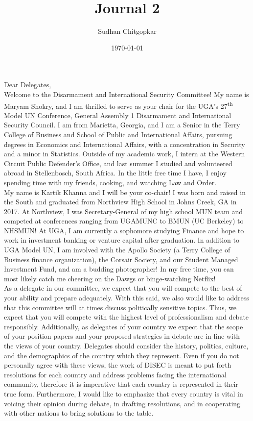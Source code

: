 \documentclass[10pt, letterpaper]{article}
\title{Journal 2}
\author{Sudhan Chitgopkar}
\date{\today}
\begin{document}
Dear Delegates,\\

Welcome to the Disarmament and International Security
Committee! My name is Maryam Shokry, and I am thrilled to serve as your
chair for the UGA's 27\textsuperscript{th} Model UN Conference, General
Assembly 1 Disarmament and International Security Council. I am from
Marietta, Georgia, and I am a Senior in the Terry College of Business
and School of Public and International Affairs, pursuing degrees in
Economics and International Affairs, with a concentration in Security
and a minor in Statistics. Outside of my academic work, I intern at the
Western Circuit Public Defender's Office, and last summer I studied and
volunteered abroad in Stellenbosch, South Africa. In the little free
time I have, I enjoy spending time with my friends, cooking, and
watching Law and Order. \\

My name is Kartik Khanna and I will be your co-chair! I was born and
raised in the South and graduated from Northview High School in Johns
Creek, GA in 2017. At Northview, I was Secretary-General of my high
school MUN team and competed at conferences ranging from UGAMUNC to BMUN
(UC Berkeley) to NHSMUN! At UGA, I am currently a sophomore studying
Finance and hope to work in investment banking or venture capital after
graduation. In addition to UGA Model UN, I am involved with the Apollo
Society (a Terry College of Business finance organization), the Corsair
Society, and our Student Managed Investment Fund, and am a budding
photographer! In my free time, you can most likely catch me cheering on
the Dawgs or binge-watching Netflix! \\

As a delegate in our committee, we expect that you will compete
to the best of your ability and prepare adequately. With this said, we
also would like to address that this committee will at times discuss
politically sensitive topics. Thus, we expect that you will compete with
the highest level of professionalism and debate responsibly.
Additionally, as delegates of your country we expect that the scope of
your position papers and your proposed strategies in debate are in line
with the views of your country. Delegates should consider the history,
politics, culture, and the demographics of the country which they
represent. Even if you do not personally agree with these views, the
work of DISEC is meant to put forth resolutions for each country and
address problems facing the international community, therefore it is
imperative that each country is represented in their true form.
Furthermore, I would like to emphasize that every country is vital in
voicing their opinion during debate, in drafting resolutions, and in
cooperating with other nations to bring solutions to the table. \\
\end{document}
